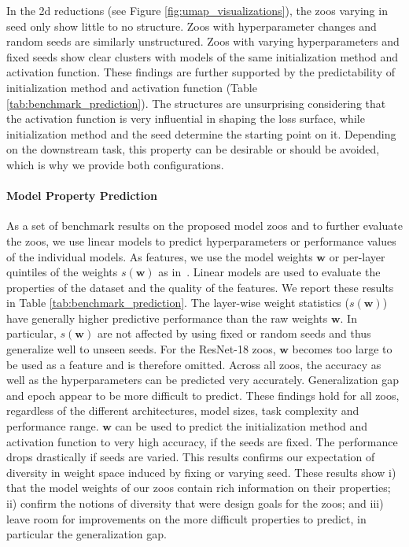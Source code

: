 In the 2d reductions (see Figure \ref{fig:umap_visualizations}), the zoos varying in seed only show little to no structure. Zoos with hyperparameter changes and random seeds are similarly unstructured. Zoos with varying hyperparameters and fixed seeds show clear clusters with models of the same initialization method and activation function. These findings are further supported by the predictability of initialization method and activation function (Table \ref{tab:benchmark_prediction}). The structures are unsurprising considering that the activation function is very influential in shaping the loss surface, while initialization method and the seed determine the starting point on it. Depending on the downstream task, this property can be desirable or should be avoided, which is why we provide both configurations.

\paragraph{Model Property Prediction}
As a set of benchmark results on the proposed model zoos and to further evaluate the zoos, we use linear models to predict hyperparameters or performance values of the individual models. 
As features, we use the model weights $\mathbf{w}$ or per-layer quintiles of the weights $s(\mathbf{w})$ as in~\citep{unterthinerPredictingNeuralNetwork2020}.
Linear models are used to evaluate the properties of the dataset and the quality of the features.
We report these results in Table \ref{tab:benchmark_prediction}.
The layer-wise weight statistics ($s(\mathbf{w})$) have generally higher predictive performance than the raw weights $\mathbf{w}$. 
In particular, $s(\mathbf{w})$ are not affected by using fixed or random seeds and thus generalize well to unseen seeds.
For the ResNet-18 zoos, $\mathbf{w}$ becomes too large to be used as a feature and is therefore omitted.
Across all zoos, the accuracy as well as the hyperparameters can be predicted very accurately. 
Generalization gap and epoch appear to be more difficult to predict. 
These findings hold for all zoos, regardless of the different architectures, model sizes, task complexity and performance range.
$\mathbf{w}$ can be used to predict the initialization method and activation function to very high accuracy, if the seeds are fixed. The performance drops drastically if seeds are varied. This results confirms our expectation of diversity in weight space induced by fixing or varying seed.
These results show i) that the model weights of our zoos contain rich information on their properties; ii) confirm the notions of diversity that were design goals for the zoos; and iii) leave room for improvements on the more difficult properties to predict, in particular the generalization gap.

